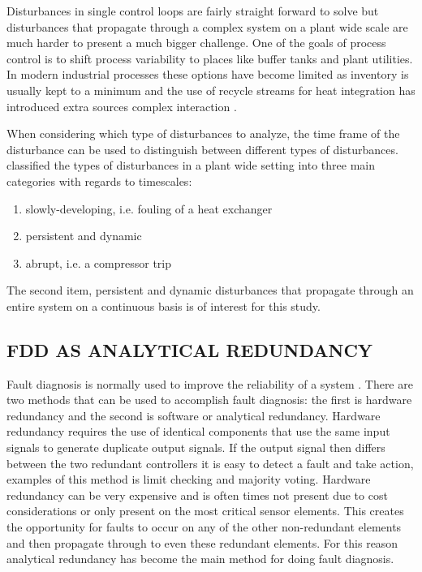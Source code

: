 Disturbances in single control loops are fairly straight forward to solve but disturbances that propagate through a complex system on a plant wide scale are much harder to present a much bigger challenge. One of the goals of process control is to shift process variability to places like buffer tanks and plant utilities. In modern industrial processes these options have become limited as inventory is usually kept to a minimum and the use of recycle streams for heat integration has introduced extra sources complex interaction \cite{thornhill2007advances}.

When considering which type of disturbances to analyze, the time frame of the disturbance can be used to distinguish between different types of disturbances. \cite{thornhill2007advances} classified the types of disturbances in a plant wide setting into three main categories with regards to timescales:
\begin{enumerate}
	\item slowly-developing, i.e. fouling of a heat exchanger
	\item persistent and dynamic
	\item abrupt, i.e. a compressor trip
\end{enumerate}
The second item, persistent and dynamic disturbances that propagate through an entire system on a continuous basis is of interest for this study.

\subsection{FDD AS ANALYTICAL REDUNDANCY}

Fault diagnosis is normally used to improve the reliability of a system \cite{gao2015survey}. There are two methods that can be used to accomplish fault diagnosis: the first is hardware redundancy and the second is software or analytical redundancy. Hardware redundancy requires the use of identical components that use the same input signals to generate duplicate output signals. If the output signal then differs between the two redundant controllers it is easy to detect a fault and take action, examples of this method is limit checking and majority voting. Hardware redundancy can be very expensive and is often times not present due to cost considerations or only present on the most critical sensor elements. This creates the opportunity for faults to occur on any of the other non-redundant elements and then propagate through to even these redundant elements. For this reason analytical redundancy has become the main method for doing fault diagnosis. 

